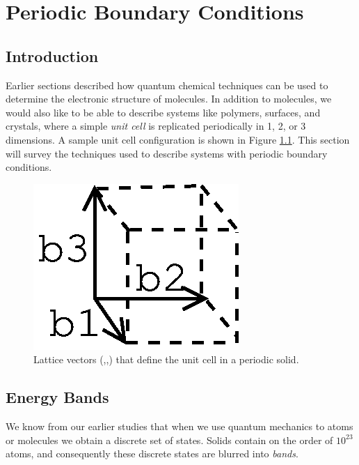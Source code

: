 \chapter{Periodic Boundary Conditions}

\graphicspath{{./Figures/PBC/}}

\section{Introduction}
Earlier sections described how quantum chemical techniques can be used
to determine the electronic structure of molecules. In addition to
molecules, we would also like to be able to describe systems like
polymers, surfaces, and crystals, where a simple \emph{unit cell} is
replicated periodically in 1, 2, or 3 dimensions. A sample unit cell
configuration is shown in Figure \ref{lattice-vectors}. This section
will survey the techniques used to describe systems with periodic
boundary conditions.

\begin{figure}
\begin{center}
\includegraphics{lattice-vectors.eps}
\caption{Lattice vectors (,,) that
define the unit cell in a periodic solid.}
\label{lattice-vectors}
\end{center}
\end{figure}

\section{Energy Bands}
We know from our earlier studies that when we use quantum mechanics to
atoms or molecules we obtain a discrete set of states. Solids contain
on the order of $10^{23}$ atoms, and consequently these discrete
states are blurred into \emph{bands}.

